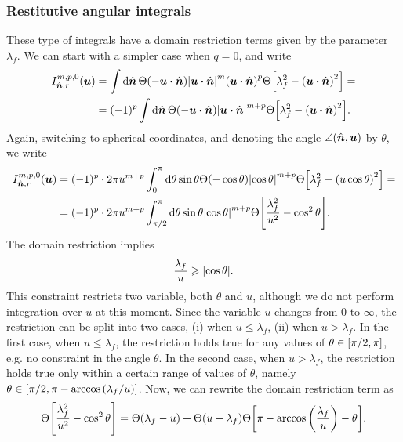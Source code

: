 \documentclass[aps,prl,preprint,groupedaddress,10pt]{revtex4-2}
\begin{document}
\subsubsection{Restitutive angular integrals}
These type of integrals have a domain restriction terms given by the parameter $\lambda_f$.
We can start with a simpler case when $q=0$, and write
\begin{equation}
    \begin{split}
        I_{\bn,r}^{m,p,0}(\bu)&=\int\dd{\bn}\Theta\pqty{-\bu\vdot\bn}
        \abs{\bu\vdot\bn}^m\pqty{\bu\vdot\bn}^p
        \Theta\bqty{\lambda_f^2-\pqty{\bu\vdot\bn}^2}=\\
        &=(-1)^p\int\dd{\bn}\Theta\pqty{-\bu\vdot\bn}
        \abs{\bu\vdot\bn}^{m+p}
        \Theta\bqty{\lambda_f^2-\pqty{\bu\vdot\bn}^2}.
    \end{split}
\end{equation}
Again, switching to spherical coordinates, and denoting the angle $\angle(\hat{\vb*{n}},\vb*{u})$ by
$\theta$, we write
\begin{equation}
    \begin{split}
        I_{\bn,r}^{m,p,0}(\bu)&=(-1)^p\cdot 2\pi u^{m+p}\int_0^{\pi}\dd{\theta}\sin\theta
        \Theta\pqty{-\cos\theta}\abs{\cos\theta}^{m+p}
        \Theta\bqty{\lambda_f^2-\pqty{u\cos\theta}^2}=\\
        &=(-1)^p\cdot 2\pi u^{m+p}\int_{\pi/2}^{\pi}\dd{\theta}\sin\theta
        \abs{\cos\theta}^{m+p}\Theta\bqty{\frac{\lambda_f^2}{u^2}-\cos^2\theta}.
    \end{split}
\end{equation}
The domain restriction implies
\begin{equation}
    \frac{\lambda_f}{u}\geqslant\abs{\cos\theta}.
\end{equation}
This constraint restricts two variable, both $\theta$ and $u$, although we do not perform
integration over $u$ at this moment. Since the variable $u$ changes from $0$ to $\infty$,
the restriction can be split into two cases, (i) when $u\leqslant\lambda_f$, (ii) when
$u>\lambda_f$. In the first case, when $u\leqslant\lambda_f$, the restriction holds true
for any values of $\theta\in\bqty{\pi/2,\pi}$, e.g. no constraint in the angle $\theta$.
In the second case, when $u>\lambda_f$, the restriction holds true only within a certain
range of values of $\theta$, namely $\theta\in\bqty{\pi/2,\pi-\arccos\pqty{\lambda_f/u}}$.
Now, we can rewrite the domain restriction term as
\begin{equation}
    \Theta\bqty{\frac{\lambda_f^2}{u^2}-\cos^2\theta}=
    \Theta\pqty{\lambda_f-u}+\Theta\pqty{u-\lambda_f}
    \Theta\bqty{\pi-\arccos\pqty{\frac{\lambda_f}{u}}-\theta}.
\end{equation}
\end{document}
